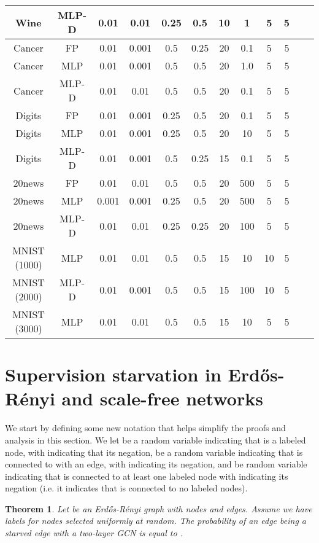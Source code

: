 \documentclass{article}
\newtheorem{theorem}{Theorem}
\begin{document}
\begin{table*}
\begin{center}
\begin{tabular}{c|c|cccccccccc}
Wine & MLP-D & 0.01 & 0.01 & 0.25 & 0.5 & 10 & 1 & 5 & 5\\ \hline
Cancer & FP & 0.01 & 0.001 & 0.5 & 0.25 & 20 & 0.1 & 5 & 5\\
Cancer & MLP & 0.01 & 0.001 & 0.5 & 0.5 & 20 & 1.0 & 5 & 5\\
Cancer & MLP-D & 0.01 & 0.01 & 0.5 & 0.5 & 20 & 0.1 & 5 & 5\\ \hline
Digits & FP & 0.01 & 0.001 & 0.25 & 0.5 & 20 & 0.1 & 5 & 5\\
Digits & MLP & 0.01 & 0.001 & 0.25 & 0.5 & 20 & 10 & 5 & 5\\
Digits & MLP-D & 0.01 & 0.001 & 0.5 & 0.25 & 15 & 0.1 & 5 & 5\\ \hline
20news & FP & 0.01 & 0.01 & 0.5 & 0.5 & 20 & 500 & 5 & 5\\
20news & MLP & 0.001 & 0.001 & 0.25 & 0.5 & 20 & 500 & 5 & 5\\
20news & MLP-D & 0.01 & 0.01 & 0.25 & 0.25 & 20 & 100 & 5 & 5\\
\hline
MNIST (1000) & MLP & 0.01 & 0.01 & 0.5 & 0.5 & 15 & 10 & 10 & 5\\
MNIST (2000) & MLP-D & 0.01 & 0.001 & 0.5 & 0.5 & 15 & 100 & 10 & 5\\
MNIST (3000) & MLP & 0.01 & 0.01 & 0.5 & 0.5 & 15 & 10 & 5 & 5
\end{tabular}
\end{center}
\end{table*}

\section{Supervision starvation in Erd\H{o}s-R\'enyi and scale-free networks}

We start by defining some new notation that helps simplify the proofs and analysis in this section. We let  be a random variable indicating that  is a labeled node, with  indicating that its negation,  be a random variable indicating that  is connected to  with an edge, with  indicating its negation, and  be random variable indicating that  is connected to at least one labeled node with  indicating its negation (i.e. it indicates that  is connected to no labeled nodes).  

\begin{theorem}\label{th:main}
Let  be an Erd\H{o}s-R\'enyi graph with  nodes and  edges. Assume we have labels for  nodes selected uniformly at random. 
The probability of an edge being a starved edge with a two-layer GCN is equal to .
\end{theorem}
\end{document}
